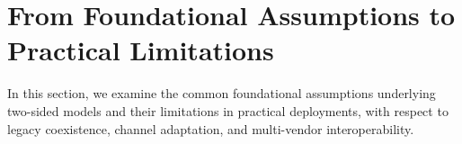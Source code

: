 \documentclass[10pt,twocolumn]{IEEEtran}
\begin{document}












\section{From Foundational Assumptions to Practical Limitations}\label{Sec:Question}

In this section, we examine the common foundational assumptions underlying two-sided models and their limitations in practical deployments, with respect to legacy coexistence, channel adaptation, and multi-vendor interoperability.

\end{document}
